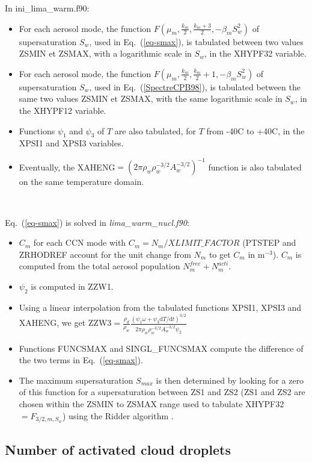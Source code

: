 In ini\_lima\_warm.f90:
\begin{itemize}
 \item For each aerosol mode, the function $F\left(\mu_m,\frac{k_m}{2},\frac{k_m+3}{2},-\beta_mS_w^2\right)$ of supersaturation $S_w$, used in Eq.\ (\ref{eq-smax}), is tabulated between two values ZSMIN et ZSMAX, with a logarithmic scale in $S_w$, in the XHYPF32 variable.
 \item For each aerosol mode, the function $F\left(\mu_m,\frac{k_m}{2},\frac{k_m}{2}+1,-\beta_mS_w^2\right)$ of supersaturation $S_w$, used in Eq.\ (\ref{SpectreCPB98}), is tabulated between the same two values ZSMIN et ZSMAX, with the same logarithmic scale in $S_w$, in the XHYPF12 variable.
 \item Functions $\psi_1$ and $\psi_3$ of $T$ are also tabulated, for $T$ from -40\textdegree C to +40\textdegree C, in the XPSI1 and XPSI3 variables.
 \item Eventually, the XAHENG$=(2 \pi \rho_w \rho_w^{-3/2} A_w^{-3/2} )^{-1}$ function is also tabulated on the same temperature domain.
\end{itemize}

~\newline

Eq.\ (\ref{eq-smax}) is solved in \emph{lima\_warm\_nucl.f90}:
\begin{itemize}
 \item $C_m$ for each CCN mode with $C_m = N_m/XLIMIT\_FACTOR$ (PTSTEP and ZRHODREF account for the unit change from $N_m$ to get $C_m$ in m$^{-3}$). $C_m$ is computed from the total aerosol population $N^{free}_m+N^{acti}_m$.
 \item $\psi_2$ is computed in ZZW1.
 \item Using a linear interpolation from the tabulated functions XPSI1, XPSI3 and XAHENG, we get ZZW3$= \frac{\rho_d}{\rho_w} \frac{(\psi_1 \omega + \psi_3 \mathrm{d}T/\mathrm{d}t)^{3/2}}{2 \pi \rho_w \rho_w^{-3/2} A_w^{-3/2} \psi_2}$
 \item Functions FUNCSMAX and SINGL\_FUNCSMAX compute the difference of the two terms in Eq.\ (\ref{eq-smax}).
 \item The maximum supersaturation $S_{max}$ is then determined by looking for a zero of this function for a supersaturation between ZS1 and ZS2 (ZS1 and ZS2 are chosen within the ZSMIN to ZSMAX range used to tabulate XHYPF32$=F_{3/2,m,S_w}$) using the Ridder algorithm \citep{Press1992}. 
\end{itemize}

\subsection{Number of activated cloud droplets}

